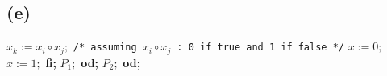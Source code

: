\subsection{(e)}

\begin{algorithmic}[1]
\State \( x_k := x_i \circ x_j; \) \texttt{/* assuming \( x_i \circ x_j \) : 0 if true and 1 if false */}
    \State \( x := 0; \)
\Else 
    \State \( x := 1; \)
\EndIf \textbf{fi;}
    \State  \( P_1; \)
\EndFor \textbf{od;}
    \State  \( P_2; \)
\EndFor \textbf{od;}
\end{algorithmic}



